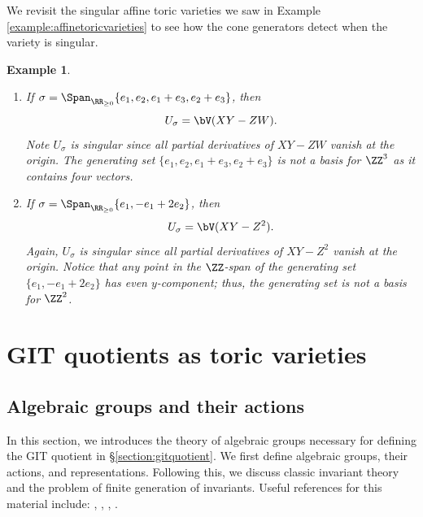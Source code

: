 \documentclass[12pt]{amsart}
\theoremstyle{plain}
\newtheorem{example}[theorem]{Example}
\begin{document}
We revisit the singular affine toric varieties we saw in Example \ref{example:affinetoricvarieties} to see how the cone generators detect when the variety is singular.

\begin{example}
\begin{enumerate}
\item If $\sigma = \Span_{\RR_{\ge 0}}\{e_1, e_2, e_1+e_3, e_2+e_3\}$, then
$$U_\sigma = \bV(XY - ZW).$$
Note $U_\sigma$ is singular since all partial derivatives of $XY-ZW$ vanish at the origin.
The generating set $\{e_1, e_2, e_1+e_3, e_2+e_3\}$ is not a basis for $\ZZ^3$ as it contains four vectors.
\item If $\sigma = \Span_{\RR_{\ge 0}}\{e_1, -e_1+2e_2\}$, then
$$U_\sigma = \bV(XY - Z^2).$$
Again, $U_\sigma$ is singular since all partial derivatives of $XY-Z^2$ vanish at the origin.
Notice that any point in the $\ZZ$-span of the generating set $\{e_1, -e_1+2e_2\}$ has even $y$-component; thus, the generating set is not a basis for $\ZZ^2$.
\end{enumerate}
\end{example}








\newpage
\section{GIT quotients as toric varieties}\label{chapter:gitquotientsastoricvarieties}
%




\subsection{Algebraic groups and their actions}
In this section, we introduces the theory of algebraic groups necessary for defining the GIT quotient in \S \ref{section:gitquotient}.
We first define algebraic groups, their actions, and representations.
Following this, we discuss classic invariant theory and the problem of finite generation of invariants.
Useful references for this material include: \cite{Humphreys75}, \cite{Geck13}, \cite{Springer98}, \cite{Mukai03}.
\end{document}
